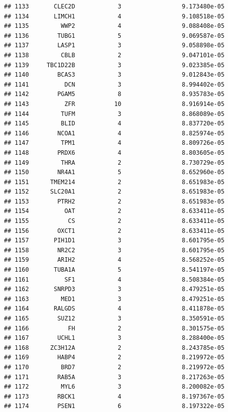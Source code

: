 \documentclass[
]{article}
\begin{document}
\begin{verbatim}
## 1133       CLEC2D            3                 9.173480e-05
## 1134       LIMCH1            4                 9.108518e-05
## 1135         WWP2            4                 9.088408e-05
## 1136        TUBG1            5                 9.069587e-05
## 1137        LASP1            3                 9.058898e-05
## 1138         CBLB            2                 9.047101e-05
## 1139     TBC1D22B            3                 9.023385e-05
## 1140        BCAS3            3                 9.012843e-05
## 1141          DCN            3                 8.994402e-05
## 1142        PGAM5            8                 8.935783e-05
## 1143          ZFR           10                 8.916914e-05
## 1144         TUFM            3                 8.868089e-05
## 1145         BLID            4                 8.837720e-05
## 1146        NCOA1            4                 8.825974e-05
## 1147         TPM1            4                 8.809726e-05
## 1148        PRDX6            4                 8.803605e-05
## 1149         THRA            2                 8.730729e-05
## 1150        NR4A1            5                 8.652960e-05
## 1151      TMEM214            2                 8.651983e-05
## 1152      SLC20A1            2                 8.651983e-05
## 1153        PTRH2            2                 8.651983e-05
## 1154          OAT            2                 8.633411e-05
## 1155           CS            2                 8.633411e-05
## 1156        OXCT1            2                 8.633411e-05
## 1157       PIH1D1            3                 8.601795e-05
## 1158        NR2C2            3                 8.601795e-05
## 1159        ARIH2            4                 8.568252e-05
## 1160       TUBA1A            5                 8.541197e-05
## 1161          SF1            4                 8.508384e-05
## 1162       SNRPD3            3                 8.479251e-05
## 1163         MED1            3                 8.479251e-05
## 1164       RALGDS            4                 8.411878e-05
## 1165        SUZ12            3                 8.350591e-05
## 1166           FH            2                 8.301575e-05
## 1167        UCHL1            3                 8.288400e-05
## 1168      ZC3H12A            2                 8.243785e-05
## 1169        HABP4            2                 8.219972e-05
## 1170         BRD7            2                 8.219972e-05
## 1171        RAB5A            3                 8.217263e-05
## 1172         MYL6            3                 8.200082e-05
## 1173        RBCK1            4                 8.197367e-05
## 1174        PSEN1            6                 8.197322e-05

\end{verbatim}
\end{document}
